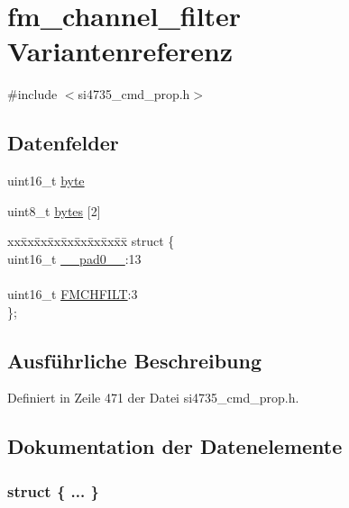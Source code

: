 \hypertarget{unionfm__channel__filter}{}\section{fm\+\_\+channel\+\_\+filter Variantenreferenz}
\label{unionfm__channel__filter}


{\ttfamily \#include $<$si4735\+\_\+cmd\+\_\+prop.\+h$>$}

\subsection*{Datenfelder}
\begin{DoxyCompactItemize}
\item 
uint16\+\_\+t \hyperlink{unionfm__channel__filter_ab0549c1b5ea980a02e7eab77e21fea49}{byte}
\item 
uint8\+\_\+t \hyperlink{unionfm__channel__filter_a46e4c05d20a047ec169f60d3167e912e}{bytes} \mbox{[}2\mbox{]}
\item 
\begin{tabbing}
xx\=xx\=xx\=xx\=xx\=xx\=xx\=xx\=xx\=\kill
struct \{\\
\>uint16\_t \hyperlink{unionfm__channel__filter_a77132c2c26a75f5b8751b235cda23828}{\_\_pad0\_\_}:13\\
\>\\
\>uint16\_t \hyperlink{unionfm__channel__filter_a584b5186edaab50c1b4bbc2fea4d0a3b}{FMCHFILT}:3\\
\}; \\

\end{tabbing}\end{DoxyCompactItemize}


\subsection{Ausführliche Beschreibung}


Definiert in Zeile 471 der Datei si4735\+\_\+cmd\+\_\+prop.\+h.



\subsection{Dokumentation der Datenelemente}
\hypertarget{unionfm__channel__filter_a8dfd02a0919b128fd74f7a3f9a4588c0}{}\subsubsection[{"@49}]{\setlength{\rightskip}{0pt plus 5cm}struct \{ ... \} }\label{unionfm__channel__filter_a8dfd02a0919b128fd74f7a3f9a4588c0}
\hypertarget{unionfm__channel__filter_a77132c2c26a75f5b8751b235cda23828}{}
